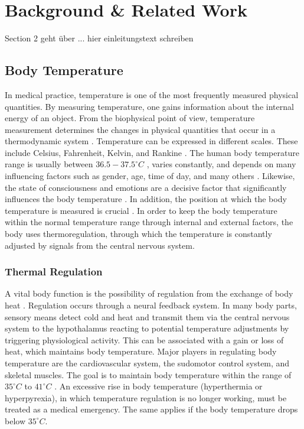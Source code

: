 
\chapter{Background \& Related Work}
\label{ch:Background}
Section 2 geht über ... hier einleitungstext schreiben

\section{Body Temperature}
\label{Background:BodyTemperature}
In medical practice, temperature is one of the most frequently measured physical quantities.
By measuring temperature, one gains information about the internal energy of an object.
From the biophysical point of view, temperature measurement determines the changes in physical quantities that occur in a thermodynamic system \cite{dolibogComparativeAnalysisHuman2022}.
Temperature can be expressed in different scales.
These include Celsius, Fahrenheit, Kelvin, and Rankine \cite{grodzinskyUnderstandingFeverBody2020}.
The human body temperature range is usually between $36.5-37.5^\circ C$ \cite{hutchisonHypothermiaTherapyTraumatic2008}, varies constantly, and depends on many influencing factors such as gender, age, time of day, and many others \cite{sund-levanderNormalOralRectal2002}.
Likewise, the state of consciousness and emotions are a decisive factor that significantly influences the body temperature \cite{barbosaescobarTemperatureEmotions2021}.
In addition, the position at which the body temperature is measured is crucial \cite{Physiologie9783137960072ZVAB}.
In order to keep the body temperature within the normal temperature range through internal and external factors, the body uses thermoregulation, through which the temperature is constantly adjusted by signals from the central nervous system.

\subsection{Thermal Regulation}
\label{Background:BodyTemperature:ThermalRegulation}
A vital body function is the possibility of regulation from the exchange of body heat \cite{grodzinskyUnderstandingFeverBody2020}.
Regulation occurs through a neural feedback system. 
In many body parts, sensory means detect cold and heat and transmit them via the central nervous system to the hypothalamus reacting to potential temperature adjustments by triggering physiological activity. 
This can be associated with a gain or loss of heat, which maintains body temperature.
Major players in regulating body temperature are the cardiovascular system, the sudomotor control system, and skeletal muscles. 
The goal is to maintain body temperature within the range of $35^\circ C$ to $41^\circ C$ \cite{pierauTemperatursensibilitaet2001}. 
An excessive rise in body temperature (hyperthermia or hyperpyrexia), in which temperature regulation is no longer working, must be treated as a medical emergency.
The same applies if the body temperature drops below $35^\circ C$.

